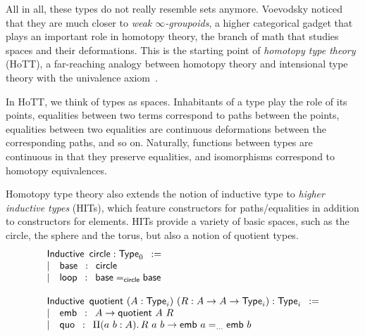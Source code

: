 All in all, these types do not really resemble sets anymore. 
% 
Voevodsky noticed that they are much closer to \emph{weak \( \infty \)-groupoids}, 
a higher categorical gadget that plays an important role in homotopy theory, 
the branch of math that studies spaces and their deformations.
% 
This is the starting point of \emph{homotopy type theory} (HoTT), a far-reaching analogy
between homotopy theory and intensional type theory with the univalence 
axiom~\cite{hottbook}.

In HoTT, we think of types as spaces. Inhabitants of a type 
play the role of its points, equalities between two terms correspond to paths
between the points, equalities between two equalities are continuous
deformations between the corresponding paths, and so on. 
% 
Naturally, functions between types are continuous in that they preserve
equalities, and isomorphisms correspond to homotopy equivalences.

Homotopy type theory also extends the notion of inductive type to 
\emph{higher inductive types} (HITs), which feature constructors for paths/equalities
in addition to constructors for elements.
% 
HITs provide a variety of basic spaces, such as the circle, the sphere and
the torus, but also a notion of quotient types.
% 
\[
\begin{array}{l}
\mathsf{Inductive}\enskip\mathsf{circle} : \varType_0\enskip := \\
\sep \quad \mathsf{base} \enskip : \enskip \mathsf{circle}\\
\sep \quad \mathsf{loop} \enskip : \enskip \Indeq{\mathsf{circle}}{\mathsf{base}}{\mathsf{base}} \\
\\
\mathsf{Inductive}\enskip\mathsf{quotient}\ (A : \varType_i)\ (R : A \to A \to \varType_i) : \varType_i\enskip := \\
\sep \quad \mathsf{emb} \enskip : \enskip A \to \mathsf{quotient}\ A\ R \\
\sep \quad \mathsf{quo} \enskip : \enskip \Depfun[a\ b]{A}{R\ a\ b \to \Indeq{...}{\mathsf{emb}\ a}{\mathsf{emb}\ b}} \\
\end{array}
\]

